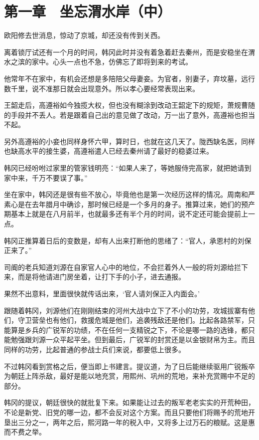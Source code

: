 \section{第一章　坐忘渭水岸（中）}

欧阳修去世消息，惊动了京城，却还没有传到关西。

离着锁厅试还有一个月的时间，韩冈此时并没有着急着赶去秦州，而是安稳坐在渭水之滨的家中。心头一点也不急，仿佛忘了即将到来的考试。

他常年不在家中，有机会还想是多陪陪父母妻妾。为官者，别妻子，弃坟墓，远行数千里，说不准那日就会出现意外。所以孝心要经常表现出来。

王韶走后，高遵裕如今独揽大权，但也没有糊涂到改动王韶定下的规矩，萧规曹随的手段并不丢人。若是跟着自己出的意见做了改动，万一出了意外，高遵裕也担当不起。

另外高遵裕的小妾也同样身怀六甲，算时日，也就在这几天了。陇西缺名医，同样也缺高水平的接生婆，高遵裕遣人已经去秦州请了最好的稳婆过来。

韩冈已经吩咐过家里的管家钱明亮：“如果人来了，等她服侍完高家，就把她请到家中来，千万不要误了事。”

坐在家中，韩冈还是很有些不放心，毕竟他也是第一次经历这样的情况。周南和严素心是在去年腊月中确诊，那时候已经是一个多月的身子。推算过来，她们的预产期基本上就是在八月前半，也就最多还有半个月的时间，说不定还可能会提前上一点。

韩冈正推算着日后的变数是，却有人出来打断他的思绪了：“官人，承恩村的刘保正来了。”

司阍的老兵知道刘源在自家官人心中的地位，不会拦着外人一般的将刘源给拦下来，而是将他请进门房坐着，让打下手的小子，进去通报。

果然不出意料，里面很快就传话出来，‘官人请刘保正入内面会。’

跟随着韩冈，刘源他们在刚刚结束的河州大战中立下了不小的功劳，攻城拔寨有他们，守卫营垒也有他们，救援危城是他们，追袭残敌还是他们。比起各路禁军，只能算是乡兵的广锐军的功绩，不在任何一支精锐之下，不论是哪一路的选锋，都只能勉强跟刘源一众平起平坐。但到最后，广锐军的封赏还是以金银财帛为主。而且同样的功劳，比起普通的参战士兵们来说，都要低上很多。

不过韩冈看到赏格之后，便当即上书建言。提议道，为了日后能继续驱用广锐叛卒为朝廷上阵杀敌，最好是能以地充赏，用熙州、巩州的荒地，来补充赏赐中不足的部分。

韩冈的提议，朝廷很快的就批复下来。如果能让过去的叛军老老实实的开荒种田，不论是新党、旧党的哪一边，都不会反对这个方案。而且只要他们将赐予的荒地开垦出三分之一，两年之后，熙河路一年的税入中，又将多上过万石的粮赋。这是惠而不费之举。

